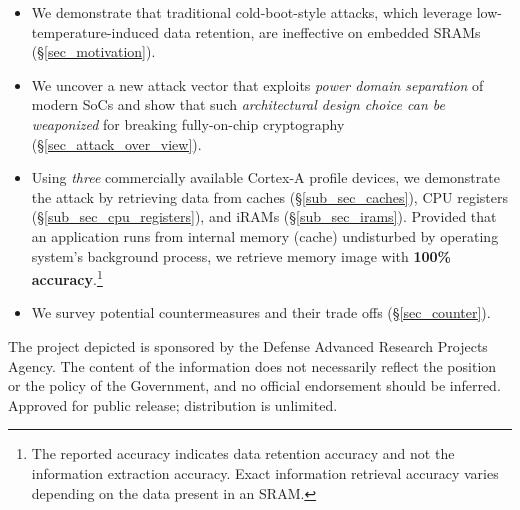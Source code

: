 \begin{itemize}
    \item We demonstrate that traditional cold-boot-style attacks, which leverage low-temperature-induced data retention, are ineffective on embedded SRAMs (\S\ref{sec_motivation}).
    \item We uncover a new attack vector that exploits \textit{power domain separation} of modern SoCs and show that such \textit{architectural design choice can be weaponized} for breaking fully-on-chip cryptography (\S\ref{sec_attack_over_view}). 
    \item Using \textit{three} commercially available Cortex-A profile devices, we demonstrate the attack by retrieving data from caches (\S\ref{sub_sec_caches}), CPU registers (\S\ref{sub_sec_cpu_registers}), and iRAMs (\S\ref{sub_sec_irams}). Provided that an application runs from internal memory (\eg cache) undisturbed by operating system's background process,  we retrieve memory image with \textbf{100\% accuracy}.\footnote{The reported accuracy indicates data retention accuracy and not the information extraction accuracy. Exact information retrieval accuracy varies depending on the data present in an SRAM.}
    \item We survey potential countermeasures and their trade offs (\S\ref{sec_counter}).
\end{itemize}








\usepackage[english]{babel} \usepackage{listings}   \usepackage{keyval}	
\usepackage{xurl}\usepackage{hyperref}   \usepackage{xspace}		\usepackage{graphicx}   \usepackage{url}
\usepackage{subcaption}\usepackage{amsfonts}   \usepackage{pifont}     \let\Bbbk\relax
\newcommand{\cmark}{\ding{51}}
\newcommand{\xmark}{\ding{55}}
\usepackage{enumitem}	\usepackage{multirow}   \usepackage{multicol}
\usepackage{tikz}


\usepackage{amsmath}    \usepackage{caption}                       \usepackage[linesnumbered,ruled]{algorithm2e}
\usepackage{newtxmath}
\usepackage{fancyhdr}
\usepackage{float}
\usepackage{algorithmic}    

\usepackage{makecell}   \usepackage{bm}         

\usepackage[T1]{fontenc}\usepackage{textcomp}   

\usepackage{amssymb}\usepackage{pifont}%

\begin{acks}
The project depicted is sponsored by the Defense Advanced Research Projects Agency. The content of the information does
not necessarily reflect the position or the policy of the Government, and no official endorsement should be inferred.
Approved for public release; distribution is unlimited.
\end{acks}


